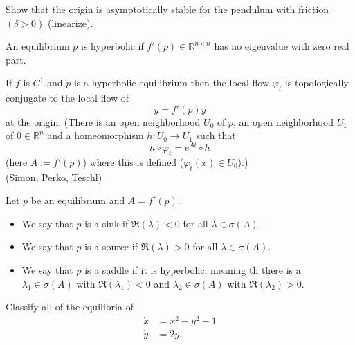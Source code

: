 \documentclass{article}
\newcommand*{\R}{\mathbb{R}}
\begin{document}
\begin{hw}
    Show that the origin is asymptotically stable for the pendulum with friction $(\delta > 0)$ (linearize).
\end{hw}

\begin{defin}
    An equilibrium $p$ is hyperbolic if $f'(p) \in \R^{n\times n}$ has no eigenvalue with zero real part.
\end{defin}

\begin{thm}
    If $f$ is $C^1$ and $p$ is a hyperbolic equilibrium then the local flow $\varphi_t$ is topologically conjugate to the local flow of
    $$\dot y = f'(p)y$$
    at the origin. (There is an open neighborhood $U_0$ of $p$, an open neighborhood $U_1$ of $0 \in \R^n$ and a homeomorphism $h:U_0 \to U_1$ such that
    $$h\circ \varphi_t = e^{At}\circ h$$
    (here $A := f'(p)$) where this is defined ($\varphi_t(x) \in U_0$).)\\
    (Simon, Perko, Teschl)
\end{thm}

\begin{defin}
    Let $p$ be an equilibrium and $A = f'(p)$.

    \begin{itemize}
        \item We say that $p$ is a sink if $\Re(\lambda) < 0$ for all $\lambda \in \sigma(A)$.

        \item We say that $p$ is a source if $\Re(\lambda)>0$ for all $\lambda \in \sigma(A)$.

        \item We say that $p$ is a saddle if it is hyperbolic, meaning th there is a $\lambda_1 \in \sigma(A)$ with $\Re(\lambda_1)<0$ and $\lambda_2 \in \sigma(A)$ with $\Re(\lambda_2)> 0$.
    \end{itemize}
\end{defin}

\begin{hw}
    Classify all of the equilibria of
    $$\begin{aligned}\dot x&=x^2-y^2-1\\
    \dot y &= 2y.\end{aligned}$$
\end{hw}
\end{document}

